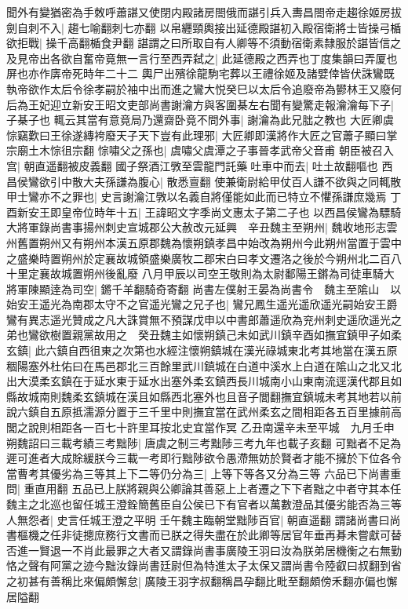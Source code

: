 聞外有變猶密為手敇呼蕭諶又使閉内殿諸房閤俄而諶引兵入夀昌閤帝走趨徐姬房拔劍自刺不入|{
	趨七喻翻刺七亦翻}
以帛纒頸輿接出延德殿諶初入殿宿衛將士皆操弓楯欲拒戰|{
	操千高翻楯食尹翻}
諶謂之曰所取自有人卿等不須動宿衛素隸服於諶皆信之及見帝出各欲自奮帝竟無一言行至西弄弑之|{
	此延德殿之西弄也丁度集韻曰弄厦也屏也亦作㢅帝死時年二十二}
輿尸出殯徐龍駒宅葬以王禮徐姬及諸嬖倖皆伏誅鸞既執帝欲作太后令徐孝嗣於袖中出而進之鸞大悦癸巳以太后令追廢帝為鬰林王又廢何后為王妃迎立新安王昭文吏部尚書謝瀹方與客圍棊左右聞有變驚走報瀹瀹每下子|{
	子棊子也}
輒云其當有意竟局乃還齋卧竟不問外事|{
	謝瀹為此兄朏之教也}
大匠卿虞悰竊歎曰王徐遂縳袴廢天子天下豈有此理邪|{
	大匠卿即漢將作大匠之官蕭子顯曰掌宗廟土木悰徂宗翻}
悰嘯父之孫也|{
	虞嘯父虞潭之子事晉孝武帝父音甫}
朝臣被召入宫|{
	朝直遥翻被皮義翻}
國子祭酒江斆至雲龍門託藥吐車中而去|{
	吐土故翻嘔也}
西昌侯鸞欲引中散大夫孫謙為腹心|{
	散悉亶翻}
使兼衛尉給甲仗百人謙不欲與之同輒散甲士鸞亦不之罪也|{
	史言謝瀹江斆以名義自將僅能如此而已特立不懼孫謙庶幾焉}
丁酉新安王即皇帝位時年十五|{
	王諱昭文字季尚文惠太子第二子也}
以西昌侯鸞為驃騎大將軍錄尚書事揚州刺史宣城郡公大赦改元延興　辛丑魏主至朔州|{
	魏收地形志雲州舊置朔州又有朔州本漢五原郡魏為懷朔鎮孝昌中始改為朔州今此朔州當置于雲中之盛樂時置朔州於定襄故城領盛樂廣牧二郡宋白曰孝文遷洛之後於今朔州北二百八十里定襄故城置朔州後亂廢}
八月甲辰以司空王敬則為太尉鄱陽王鏘為司徒車騎大將軍陳顯逹為司空|{
	鏘千羊翻騎奇寄翻}
尚書左僕射王晏為尚書令　魏主至隂山　以始安王遥光為南郡太守不之官遥光鸞之兄子也|{
	鸞兄鳳生遥光遥欣遥光嗣始安王爵}
鸞有異志遥光贊成之凡大誅賞無不預謀戊申以中書郎蕭遥欣為兖州刺史遥欣遥光之弟也鸞欲樹置親黨故用之　癸丑魏主如懷朔鎮己未如武川鎮辛酉如撫宜鎮甲子如柔玄鎮|{
	此六鎮自西徂東之次第也水經注懷朔鎮城在漢光祿城東北考其地當在漢五原稒陽塞外杜佑曰在馬邑郡北三百餘里武川鎮城在白道中溪水上白道在隂山之北又北出大漠柔玄鎮在于延水東于延水出塞外柔玄鎮西長川城南小山東南流逕漢代郡且如縣故城南則魏柔玄鎮城在漢且如縣西北塞外也且音子閭翻撫宜鎮城未考其地若以前說六鎮自五原抵濡源分置于三千里中則撫宜當在武州柔玄之間相距各五百里據前高閭之說則相距各一百七十許里耳按北史宜當作冥}
乙丑南還辛未至平城　九月壬申朔魏詔曰三載考績三考黜陟|{
	唐虞之制三考黜陟三考九年也載子亥翻}
可黜者不足為遲可進者大成賖緩朕今三載一考即行黜陟欲令愚滯無妨於賢者才能不擁於下位各令當曹考其優劣為三等其上下二等仍分為三|{
	上等下等各又分為三等}
六品已下尚書重問|{
	重直用翻}
五品已上朕將親與公卿論其善惡上上者遷之下下者黜之中者守其本任魏主之北巡也留任城王澄銓簡舊臣自公侯已下有官者以萬數澄品其優劣能否為三等人無怨者|{
	史言任城王澄之平明}
壬午魏主臨朝堂黜陟百官|{
	朝直遥翻}
謂諸尚書曰尚書樞機之任非徒摠庶務行文書而已朕之得失盡在於此卿等居官年垂再朞未嘗獻可替否進一賢退一不肖此最罪之大者又謂錄尚書事廣陵王羽曰汝為朕弟居機衡之右無勤恪之聲有阿黨之迹今黜汝錄尚書廷尉但為特進太子太保又謂尚書令陸叡曰叔翻到省之初甚有善稱比來偏頗懈怠|{
	廣陵王羽字叔翻稱昌孕翻比毗至翻頗傍禾翻亦偏也懈居隘翻}
